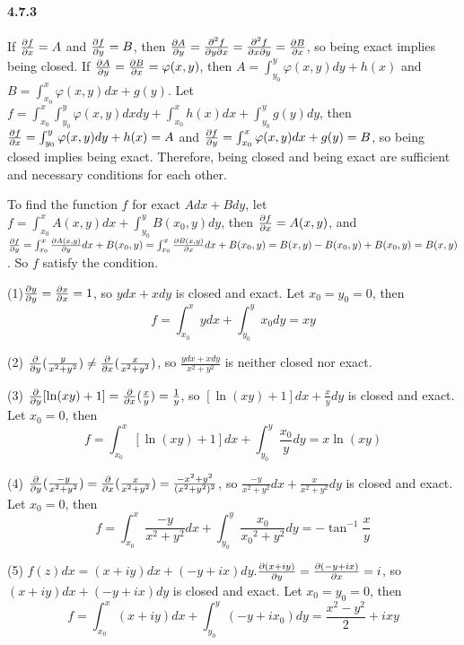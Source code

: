 \documentclass[a4paper]{article}
\begin{document}
\paragraph{4.7.3}
If $\frac{\partial f}{\partial x}=A$ and $\frac{\partial f}{\partial y}=B$, then $\frac{\partial A}{\partial y}=\frac{\partial^2f}{\partial y\partial x}=\frac{\partial^2f}{\partial x\partial y}=\frac{\partial B}{\partial x}$, so being exact implies being closed.
If $\frac{\partial A}{\partial y}=\frac{\partial B}{\partial x}=\varphi(x,y)$, then $A=\int_{y_0}^y\varphi(x,y)dy+h(x)$ and $B=\int_{x_0}^x\varphi(x,y)dx+g(y)$. Let $f=\int_{x_0}^x\int_{y_0}^y\varphi(x,y)dxdy+\int_{x_0}^xh(x)dx+\int_{y_0}^yg(y)dy$, then $\frac{\partial f}{\partial x}=\int_{y_0}^y\varphi(x,y)dy+h(x)=A$ and $\frac{\partial f}{\partial y}=\int_{x_0}^x\varphi(x,y)dx+g(y)=B$, so being closed implies being exact. Therefore, being closed and being exact are sufficient and necessary conditions for each other.
\medskip

To find the function $f$ for exact $Adx+Bdy$, let $f=\int_{x_0}^xA(x,y)dx+\int_{y_0}^yB(x_0,y)dy$, then $\frac{\partial f}{\partial x}=A(x,y)$, and $\frac{\partial f}{\partial y}=\int_{x_0}^x\frac{\partial A(x,y)}{\partial y}dx+B(x_0,y)=\int_{x_0}^x\frac{\partial B(x,y)}{\partial x}dx+B(x_0,y)=B(x,y)-B(x_0,y)+B(x_0,y)=B(x,y)$. So $f$ satisfy the condition.
\medskip

(1)$\frac{\partial y}{\partial y}=\frac{\partial x}{\partial x}=1$, so $ydx+xdy$ is closed and exact. Let $x_0=y_0=0$, then \[f=\int_{x_0}^xydx+\int_{y_0}^yx_0dy=xy\]

(2) $\frac{\partial}{\partial y}(\frac{y}{x^2+y^2})\neq\frac{\partial}{\partial x}(\frac{x}{x^2+y^2})$, so $\frac{ydx+xdy}{x^2+y^2}$ is neither closed nor exact.
\medskip

(3) $\frac{\partial}{\partial y}[\ln(xy)+1]=\frac{\partial}{\partial x}(\frac{x}{y})=\frac{1}{y}$, so $[\ln(xy)+1]dx+\frac{x}{y}dy$ is closed and exact. Let $x_0=0$, then
\[
f=\int_{x_0}^x[\ln(xy)+1]dx+\int_{y_0}^y\frac{x_0}{y}dy=x\ln(xy)
\]

(4) $\frac{\partial}{\partial y}(\frac{-y}{x^2+y^2})=\frac{\partial}{\partial x}(\frac{x}{x^2+y^2})=\frac{-x^2+y^2}{(x^2+y^2)^2}$, so $\frac{-y}{x^2+y^2}dx+\frac{x}{x^2+y^2}dy$ is closed and exact. Let $x_0=0$, then
\[
f=\int_{x_0}^x\frac{-y}{x^2+y^2}dx+\int_{y_0}^y\frac{x_0}{{x_0}^2+y^2}dy=-\tan^{-1}\frac{x}{y}
\]

(5) $f(z)dx=(x+iy)dx+(-y+ix)dy$.\quad$\frac{\partial(x+iy)}{\partial y}=\frac{\partial(-y+ix)}{\partial x}=i$, so $(x+iy)dx+(-y+ix)dy$ is closed and exact. Let $x_0=y_0=0$, then
\[
f=\int_{x_0}^x(x+iy)dx+\int_{y_0}^y(-y+ix_0)dy=\frac{x^2-y^2}{2}+ixy
\]
\end{document}
